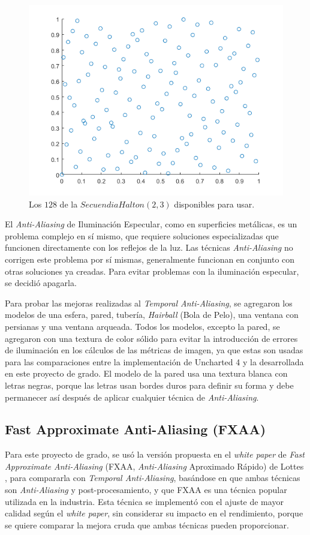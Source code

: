 \documentclass[pregrado]{tesis-usb} %
\begin{document}
\begin{figure}[!hbt]
	\centering
	\includegraphics[scale=0.5]{images/halton_128.png}
	\caption{Los $128$ de la $Secuendia Halton (2,3)$ disponibles para usar.}\label{fig:halton128}
\end{figure}

El \textit{Anti-Aliasing} de Iluminación Especular, como en superficies metálicas, es un problema complejo en sí mismo, que requiere soluciones especializadas que funcionen directamente con los reflejos de la luz. Las técnicas \textit{Anti-Aliasing} no corrigen este problema por sí mismas, generalmente funcionan en conjunto con otras soluciones ya creadas. Para evitar problemas con la iluminación especular, se decidió apagarla.

Para probar las mejoras realizadas al \textit{Temporal Anti-Aliasing}, se agregaron los modelos de una esfera, pared, tubería, \textit{Hairball} (Bola de Pelo), una ventana con persianas y una ventana arqueada. Todos los modelos, excepto la pared, se agregaron con una textura de color sólido para evitar la introducción de errores de iluminación en los cálculos de las métricas de imagen, ya que estas son usadas para las comparaciones entre la implementación de Uncharted 4 y la desarrollada en este proyecto de grado. El modelo de la pared usa una textura blanca con letras negras, porque las letras usan bordes duros para definir su forma y debe permanecer así después de aplicar cualquier técnica de \textit{Anti-Aliasing}.

\subsection{Fast Approximate Anti-Aliasing (FXAA)}
Para este proyecto de grado, se usó la versión propuesta en el \textit{white paper} de \textit{Fast Approximate Anti-Aliasing} (FXAA, \textit{Anti-Aliasing} Aproximado Rápido) de Lottes \cite{Lottes2009}, para compararla con \textit{Temporal Anti-Aliasing}, basándose en que ambas técnicas son \textit{Anti-Aliasing} y post-procesamiento, y que FXAA es una técnica popular utilizada en la industria. Esta técnica se implementó con el ajuste de mayor calidad según el \textit{white paper}, sin considerar su impacto en el rendimiento, porque se quiere comparar la mejora cruda que ambas técnicas pueden proporcionar.
\end{document}
